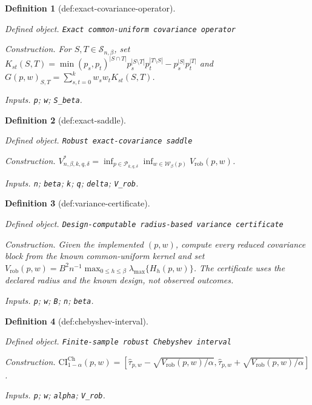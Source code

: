 \documentclass{article}
\newtheorem{definition}{Definition}
\begin{document}
\begin{definition}[def:exact-covariance-operator]\label{def:exact-covariance-operator}
\par\smallskip\noindent\emph{Defined object.} \texttt{Exact common-\allowbreak{}uniform covariance operator}
\par\smallskip\noindent\emph{Construction.} For \(S,T\in\mathcal S_{n,\beta}\), set \(K_{st}(S,T)=\min(p_s,p_t)^{|S\cap T|}p_s^{|S\setminus T|}p_t^{|T\setminus S|}-p_s^{|S|}p_t^{|T|}\) and \(G(p,w)_{S,T}=\sum_{s,t=0}^kw_sw_tK_{st}(S,T)\).
\par\smallskip\noindent\emph{Inputs.} \texttt{p}; \texttt{w}; \texttt{S\_\allowbreak{}beta}.
\end{definition}

\begin{definition}[def:exact-saddle]\label{def:exact-saddle}
\par\smallskip\noindent\emph{Defined object.} \texttt{Robust exact-\allowbreak{}covariance saddle}
\par\smallskip\noindent\emph{Construction.} \(V^*_{n,\beta,k,q,\delta}=\inf_{p\in\mathcal P_{k,q,\delta}}\inf_{w\in\mathcal W_\beta(p)}V_{\mathrm{rob}}(p,w)\).
\par\smallskip\noindent\emph{Inputs.} \texttt{n}; \texttt{beta}; \texttt{k}; \texttt{q}; \texttt{delta}; \texttt{V\_\allowbreak{}rob}.
\end{definition}

\begin{definition}[def:variance-certificate]\label{def:variance-certificate}
\par\smallskip\noindent\emph{Defined object.} \texttt{Design-\allowbreak{}computable radius-\allowbreak{}based variance certificate}
\par\smallskip\noindent\emph{Construction.} Given the implemented \((p,w)\), compute every reduced covariance block from the known common-uniform kernel and set \(V_{\mathrm{rob}}(p,w)=B^2n^{-1}\max_{0\le h\le\beta}\lambda_{\max}\{H_h(p,w)\}\). The certificate uses the declared radius and the known design, not observed outcomes.
\par\smallskip\noindent\emph{Inputs.} \texttt{p}; \texttt{w}; \texttt{B}; \texttt{n}; \texttt{beta}.
\end{definition}

\begin{definition}[def:chebyshev-interval]\label{def:chebyshev-interval}
\par\smallskip\noindent\emph{Defined object.} \texttt{Finite-\allowbreak{}sample robust Chebyshev interval}
\par\smallskip\noindent\emph{Construction.} \(\mathrm{CI}^{\mathrm{Ch}}_{1-\alpha}(p,w)=[\widehat\tau_{p,w}-\sqrt{V_{\mathrm{rob}}(p,w)/\alpha},\widehat\tau_{p,w}+\sqrt{V_{\mathrm{rob}}(p,w)/\alpha}]\).
\par\smallskip\noindent\emph{Inputs.} \texttt{p}; \texttt{w}; \texttt{alpha}; \texttt{V\_\allowbreak{}rob}.
\end{definition}
\end{document}
